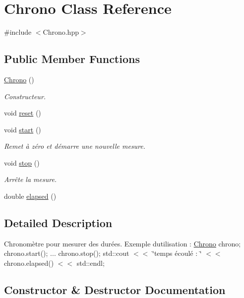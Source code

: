 \hypertarget{classChrono}{}\section{Chrono Class Reference}
\label{classChrono}


{\ttfamily \#include $<$Chrono.\+hpp$>$}

\subsection*{Public Member Functions}
\begin{DoxyCompactItemize}
\item 
\hyperlink{classChrono_a3ac5e047174f389e7bd8aae71c6b5e8c}{Chrono} ()
\begin{DoxyCompactList}\small\item\em Constructeur. \end{DoxyCompactList}\item 
void \hyperlink{classChrono_a027be23720616639bc610a98c53740ea}{reset} ()
\item 
void \hyperlink{classChrono_a25fa21b48125a6a811638aa6b8dcdbe8}{start} ()
\begin{DoxyCompactList}\small\item\em Remet à zéro et démarre une nouvelle mesure. \end{DoxyCompactList}\item 
void \hyperlink{classChrono_a7b8db2281381eac23da35a414077f3fd}{stop} ()
\begin{DoxyCompactList}\small\item\em Arrête la mesure. \end{DoxyCompactList}\item 
double \hyperlink{classChrono_aad4b00919a2eed1271259095a61b3096}{elapsed} ()
\end{DoxyCompactItemize}


\subsection{Detailed Description}
Chronomètre pour mesurer des durées. Exemple d\textquotesingle{}utilisation \+: \hyperlink{classChrono}{Chrono} chrono; chrono.\+start(); ... chrono.\+stop(); std\+::cout $<$$<$ \char`\"{}temps écoulé \+: \char`\"{} $<$$<$ chrono.\+elapsed() $<$$<$ std\+::endl; 

\subsection{Constructor \& Destructor Documentation}
\mbox{\label{classChrono_a3ac5e047174f389e7bd8aae71c6b5e8c}} 

